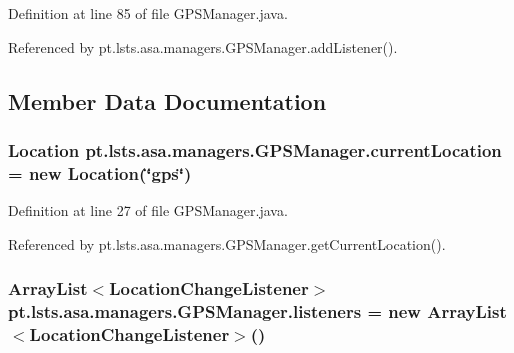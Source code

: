 Definition at line 85 of file G\+P\+S\+Manager.\+java.



Referenced by pt.\+lsts.\+asa.\+managers.\+G\+P\+S\+Manager.\+add\+Listener().



\subsection{Member Data Documentation}
\hypertarget{classpt_1_1lsts_1_1asa_1_1managers_1_1GPSManager_a291ba592c1ad6a42c3dd5bd1c721234e}{}
\subsubsection[{current\+Location}]{\setlength{\rightskip}{0pt plus 5cm}Location pt.\+lsts.\+asa.\+managers.\+G\+P\+S\+Manager.\+current\+Location = new Location(\char`\"{}gps\char`\"{})\hspace{0.3cm}{\ttfamily [private]}}\label{classpt_1_1lsts_1_1asa_1_1managers_1_1GPSManager_a291ba592c1ad6a42c3dd5bd1c721234e}


Definition at line 27 of file G\+P\+S\+Manager.\+java.



Referenced by pt.\+lsts.\+asa.\+managers.\+G\+P\+S\+Manager.\+get\+Current\+Location().

\hypertarget{classpt_1_1lsts_1_1asa_1_1managers_1_1GPSManager_a1a073ba9977885873325873a5a57f628}{}
\subsubsection[{listeners}]{\setlength{\rightskip}{0pt plus 5cm}Array\+List$<${\bf Location\+Change\+Listener}$>$ pt.\+lsts.\+asa.\+managers.\+G\+P\+S\+Manager.\+listeners = new Array\+List$<${\bf Location\+Change\+Listener}$>$()\hspace{0.3cm}{\ttfamily [private]}}\label{classpt_1_1lsts_1_1asa_1_1managers_1_1GPSManager_a1a073ba9977885873325873a5a57f628}


